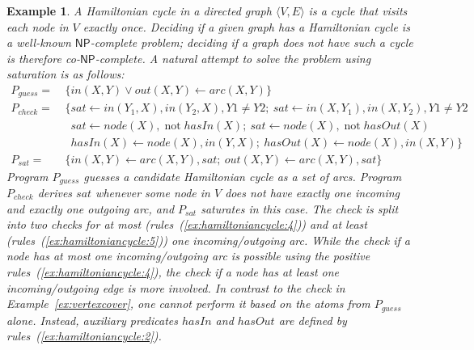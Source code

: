 \documentclass[11pt,fleqn,twoside]{article}
\def\naf{\ensuremath{\mathop{not}}}
\newcommand{\np}{\ensuremath{\mathsf{NP}}\xspace}
\newcommand{\conp}{co-\ensuremath{\mathsf{NP}}\xspace}
\newtheorem{example}{Example}
\begin{document}
			\begin{example}
				\label{ex:hamiltoniancycle}
				A \emph{Hamiltonian cycle} in a directed graph $\langle V, E \rangle$ is a cycle that visits each node in $V$ exactly once.
				Deciding if a given graph has a Hamiltonian cycle is a well-known \np-complete problem; deciding if a graph does not have such a cycle is therefore \conp-complete.
				A natural attempt to solve the problem using saturation is as follows:
				{
				\begin{align}
					P_{\mathit{guess}} = & \ \{ \mathit{in}(X,Y) \vee \mathit{out}(X,Y) \leftarrow \mathit{arc}(X,Y) \} \label{ex:hamiltoniancycle:1} \\
					P_{\mathit{check}} = & \ \{ \mathit{sat} \leftarrow \mathit{in}(Y_1,X), \mathit{in}(Y_2,X), Y1 \not= Y2; \ \mathit{sat} \leftarrow \mathit{in}(X,Y_1), \mathit{in}(X,Y_2), Y1 \not= Y2 \label{ex:hamiltoniancycle:4} \\
										& \ \phantom{\{} \mathit{sat} \leftarrow \mathit{node}(X), \naf \mathit{hasIn}(X); \ \mathit{sat} \leftarrow \mathit{node}(X), \naf \mathit{hasOut}(X) \label{ex:hamiltoniancycle:5} \\
										& \ \phantom{\{} \mathit{hasIn}(X) \leftarrow \mathit{node}(X), \mathit{in}(Y,X); \ \mathit{hasOut}(X) \leftarrow \mathit{node}(X), \mathit{in}(X,Y) \} \label{ex:hamiltoniancycle:2} \\
					P_{\mathit{sat}} = & \ \{ \mathit{in}(X,Y) \leftarrow \mathit{arc}(X,Y), \mathit{sat}; \ \mathit{out}(X,Y) \leftarrow \mathit{arc}(X,Y), \mathit{sat} \label{ex:hamiltoniancycle:6} \}
				\end{align}
				}
				Program $P_{\mathit{guess}}$ guesses a candidate Hamiltonian cycle as a set of arcs.
				Program $P_{\mathit{check}}$ derives $\mathit{sat}$ whenever some node in $V$ does not have exactly one incoming and exactly one outgoing arc,
				and $P_{\mathit{sat}}$ saturates in this case.
				The check is split into two checks for at most (rules~(\ref{ex:hamiltoniancycle:4})) and at least (rules~(\ref{ex:hamiltoniancycle:5})) one incoming/outgoing arc.
				While the check if a node has at most one incoming/outgoing arc is possible using the positive rules~(\ref{ex:hamiltoniancycle:4}),
				the check if a node has at least one incoming/outgoing edge is more involved. In contrast to the check in Example~\ref{ex:vertexcover},
				one cannot perform it based on the atoms from $P_{\mathit{guess}}$ alone. Instead, auxiliary predicates $\mathit{hasIn}$ and $\mathit{hasOut}$ are defined by rules~(\ref{ex:hamiltoniancycle:2}).

\end{example}
\end{document}
